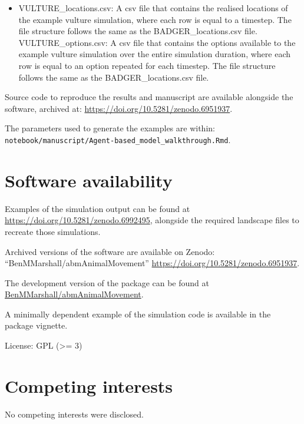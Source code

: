 \documentclass[10pt,a4paper]{article}
\begin{document}
\begin{itemize}
  KINGCOBRA\_options.csv: A csv file that contains the options available to the example king cobra simulation over the entire simulation duration, where each row is equal to an option repeated for each timestep. The file structure follows the same as the BADGER\_options.csv file.
\item
  VULTURE\_locations.csv: A csv file that contains the realised locations of the example vulture simulation, where each row is equal to a timestep. The file structure follows the same as the BADGER\_locations.csv file.
  VULTURE\_options.csv: A csv file that contains the options available to the example vulture simulation over the entire simulation duration, where each row is equal to an option repeated for each timestep. The file structure follows the same as the BADGER\_locations.csv file.
\end{itemize}

Source code to reproduce the results and manuscript are available alongside the software, archived at: \url{https://doi.org/10.5281/zenodo.6951937}.

The parameters used to generate the examples are within: \texttt{notebook/manuscript/Agent-based\_model\_walkthrough.Rmd}.

\section{Software availability}\label{software-availability}

Examples of the simulation output can be found at \url{https://doi.org/10.5281/zenodo.6992495}, alongside the required landscape files to recreate those simulations.

Archived versions of the software are available on Zenodo: ``BenMMarshall/abmAnimalMovement'' \url{https://doi.org/10.5281/zenodo.6951937}.

The development version of the package can be found at \href{https://github.com/BenMMarshall/abmAnimalMovement}{BenMMarshall/abmAnimalMovement}.

A minimally dependent example of the simulation code is available in the package vignette.

License: GPL (\textgreater= 3)

\section{Competing interests}\label{competing-interests}

No competing interests were disclosed.
\end{document}
